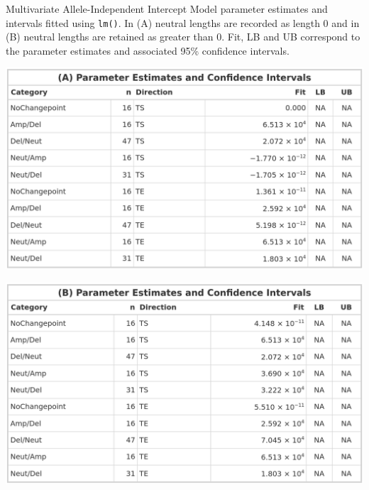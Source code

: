 \vfill 
\begin{table}[H]
    \caption[Multivariate Allele-Independent Intercept Model parameter estimates and intervals fitted using \texttt{lm()}.]{Multivariate Allele-Independent Intercept Model parameter estimates and intervals fitted using \texttt{lm()}. In (A) neutral lengths are recorded as length 0 and in (B) neutral lengths are retained as greater than 0. Fit, LB and UB correspond to the parameter estimates and associated 95\% confidence intervals. }
    \label{tbl:lm_multi_1_pred}
     \begin{subtable}[t]{.49\textwidth}
      \centering
      \includegraphics[width = 1\textwidth]{../tables/Chapter_5/Multivariate_lm_7_AI_Pred.png}
    \end{subtable}%
    \hspace{0.5cm}
     \begin{subtable}[t]{.49\textwidth}
      \centering
         \includegraphics[width = 1\textwidth]{../tables/Chapter_5/Multivariate_lm_7_Neut_AI_Pred.png}
    \end{subtable} 
\end{table}

